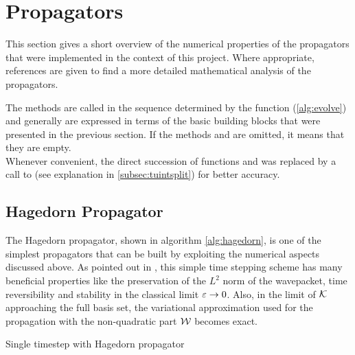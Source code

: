 \section{Propagators}
\label{sec:propagators}

This section gives a short overview of the numerical properties of the propagators that were implemented in the context of this project.
Where appropriate, references are given to find a more detailed mathematical analysis of the propagators.
\par\medskip
The methods are called in the sequence determined by the  function (\ref{alg:evolve}) and generally are expressed in terms of the basic building blocks that were presented in the previous section.
If the methods  and  are omitted, it means that they are empty. \\
Whenever convenient, the direct succession of functions  and  was replaced by a call to  (see explanation in \ref{subsec:tuintsplit}) for better accuracy.

\subsection{Hagedorn Propagator}
\label{sub:hagedorn_propagator}
%
The Hagedorn propagator, shown in algorithm \ref{alg:hagedorn}, is one of the simplest propagators that can be built by exploiting the numerical aspects discussed above.
As pointed out in \cite{FGL_semiclassical_dynamics}, this simple time stepping scheme has many beneficial properties like the preservation of the $L^2$ norm of the wavepacket, time reversibility and stability in the classical limit $\varepsilon \rightarrow 0$.
Also, in the limit of $\mathcal{K}$ approaching the full basis set, the variational approximation used for the propagation with the non-quadratic part $\mathcal{W}$ becomes exact.
\begin{algorithm}[h]
	\caption{Single timestep with Hagedorn propagator}
	\label{alg:hagedorn}
	\begin{algorithmic}
	\State
		\State
			\State {}
			\State {}
			\State {}
			\State {}
		\State
		\EndProcedure
	\end{algorithmic}
\end{algorithm}


